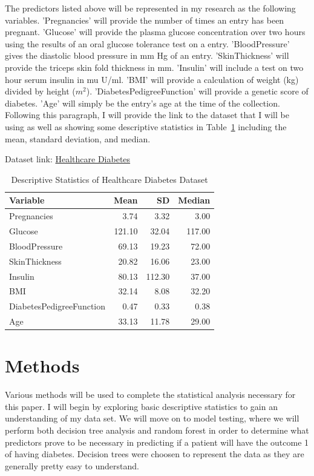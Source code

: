 \documentclass[12pt]{article}
\begin{document}
    The predictors listed above will be represented in my research as the following variables. 'Pregnancies' will provide the number of 
    times an entry has been pregnant. 'Glucose' will provide the plasma glucose concentration over two hours using the results of an oral 
    glucose tolerance test on a entry. 'BloodPressure' gives the diastolic blood pressure in mm Hg of an entry. 'SkinThickness' will 
    provide the triceps skin fold thickness in mm. 'Insulin' will include a test on two hour serum insulin in mu U/ml. 'BMI' will provide a 
    calculation of weight (kg) divided by height ($m^2$). 'DiabetesPedigreeFunction' will provide a genetic score of diabetes. 'Age' will 
    simply be the entry's age at the time of the collection. Following this paragraph, I will provide the link to the dataset that I will 
    be using as well as showing some descriptive statistics in Table~\ref{tab:ds} including the mean, standard deviation, and median.  

Dataset link: \href{https://www.kaggle.com/datasets/nanditapore/healthcare-diabetes}{Healthcare Diabetes}

\begin{table}[ht]
    \caption{Descriptive Statistics of Healthcare Diabetes Dataset}
  \label{tab:ds}
\centering
\begin{tabular}{lrrr}
      \hline
    Variable & Mean & SD & Median \\ 
      \hline
      Pregnancies & 3.74 & 3.32 & 3.00 \\ 
      Glucose & 121.10 & 32.04 & 117.00 \\ 
      BloodPressure & 69.13 & 19.23 & 72.00 \\ 
      SkinThickness & 20.82 & 16.06 & 23.00 \\ 
      Insulin & 80.13 & 112.30 & 37.00 \\ 
      BMI & 32.14 & 8.08 & 32.20 \\ 
      DiabetesPedigreeFunction & 0.47 & 0.33 & 0.38 \\ 
      Age & 33.13 & 11.78 & 29.00 \\ 
       \hline
    \end{tabular}
    \end{table}

\section{Methods}
\label{sec:meth}
    Various methods will be used to complete the statistical analysis necessary for this paper. I will begin by exploring basic 
    descriptive statistics to gain an understanding of my data set. We will move on to model testing, where we will perform both 
    decision tree analysis and random forest in order to determine what predictors prove to be necessary in predicting if a patient
    will have the outcome 1 of having diabetes. Decision trees were choosen to represent the data as they are generally pretty easy
    to understand.
\end{document}
